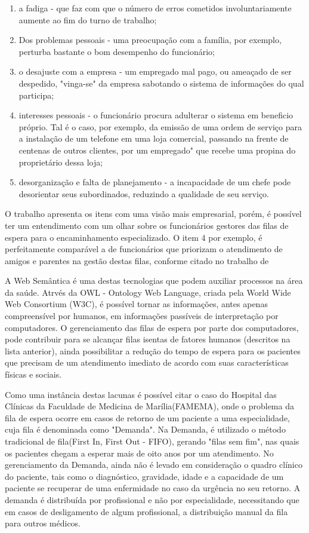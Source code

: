  \begin{enumerate}
    	\item a fadiga - que faz com que o número de erros cometidos involuntariamente aumente ao fim do turno de trabalho;
        \item Dos problemas pessoais - uma preocupação com a família, por exemplo, perturba bastante o bom desempenho do funcionário;
        \item o desajuste com a empresa - um empregado mal pago, ou ameaçado de ser despedido, "vinga-se" da empresa sabotando o sistema de informações do qual participa;
        \item interesses pessoais - o funcionário procura adulterar o sistema em beneficio próprio. Tal é o caso, por exemplo, da emissão de uma ordem de serviço para a instalação de um telefone em uma loja comercial, passando na frente de centenas de outros clientes, por um empregado" que recebe uma propina do proprietário dessa loja;
        \item desorganização e falta de planejamento - a incapacidade de um chefe pode desorientar seus subordinados, reduzindo a qualidade de seu serviço.
    \end{enumerate}
    
O trabalho apresenta os itens com uma visão mais empresarial, porém, é possível ter um entendimento com um olhar sobre os funcionários gestores das filas de espera para o encaminhamento especializado. O item 4 por exemplo, é perfeitamente comparável a de funcionários que priorizam o atendimento de amigos e parentes na gestão destas filas, conforme citado no trabalho de \cite{KRISHNAMURTI2005}

A Web Semântica é uma destas tecnologias que podem auxiliar processos na área da saúde. Atrvés da OWL - Ontology Web Language, criada pela World Wide Web Consortium (W3C), é possível tornar as informações, antes apenas compreensível por humanos, em informações passíveis de interpretação por computadores. O gerenciamento das filas de espera por parte dos computadores, pode contribuir para se alcançar filas isentas de fatores humanos (descritos na lista anterior), ainda possibilitar a redução do tempo de espera para os pacientes que precisam de um atendimento imediato de acordo com suas características físicas e sociais. 

Como uma instância destas lacunas é possível citar o caso do Hospital das Clínicas da Faculdade de Medicina de Marília(FAMEMA), onde o problema da fila de espera ocorre em casos de retorno de um paciente a uma especialidade, cuja fila é denominada como "Demanda". Na Demanda, é utilizado o método tradicional de fila(First In, First Out - FIFO), gerando "filas sem fim", nas quais os pacientes chegam a esperar mais de oito anos por um atendimento. No gerenciamento da Demanda, ainda não é levado em consideração o quadro clínico do paciente, tais como o diagnóstico, gravidade, idade e a capacidade de um paciente se recuperar de uma enfermidade no caso da urgência no seu retorno. A demanda é distribuída por profissional e não por especialidade, necessitando que em casos de desligamento de algum profissional, a distribuição manual da fila para outros médicos.

